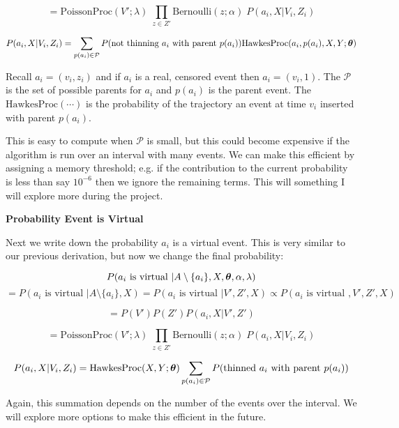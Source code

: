 \documentclass[11pt]{article}
\begin{document}
\[
  =
  \text{PoissonProc}(V'; \lambda)
  \;
  \prod_{z \in Z'}\text{Bernoulli}(z; \alpha) 
  \;
  P(a_i, X | V_i, Z_i)  
\]

\[
  P(a_i, X | V_i, Z_i)
  =
  \sum_{p(a_i) \in \mathcal{P}}
  P(\text{not thinning } a_i \text{ with parent } p(a_i))
  \text{HawkesProc}(a_i,p(a_i),X,Y; \boldsymbol{\theta})
\]

\noindent Recall $a_i = (v_i,z_i)$ and if $a_i$ is a real, censored event then $a_i = (v_i, 1)$. The $\mathcal{P}$ is the set of possible parents for $a_i$ and $p(a_i)$ is the parent event. The $\text{HawkesProc}(\cdots)$ is the probability of the trajectory an event at time $v_i$ inserted with parent $p(a_i)$.


This is easy to compute when $\mathcal{P}$ is small, but this could become expensive if the algorithm is run over an interval with many events. We can make this efficient by assigning a memory threshold; e.g. if the contribution to the current probability is less than say $10^{-6}$ then we ignore the remaining terms. This will something I will explore more during the project.

\vspace{1cm}
\noindent\textbf{Probability Event is Virtual}

\noindent Next we write down the probability $a_i$ is a virtual event. This is very similar to our previous derivation, but now we change the final probability:

\[
  P(a_i \text{ is virtual } | A \setminus \{a_i\}, X, \boldsymbol{\theta}, \alpha, \lambda)
\]
\[
  =
  P(a_i \text{ is virtual } | A \setminus \{a_i\}, X)
  =
  P(a_i \text{ is virtual } | V', Z', X)
  \propto
  P(a_i \text{ is virtual }, V', Z', X)
\]

\[
  =
  P(V')P(Z')P(a_i, X | V', Z')
\]

\[
  =
  \text{PoissonProc}(V'; \lambda)
  \;
  \prod_{z \in Z'}\text{Bernoulli}(z; \alpha) 
  \;
  P(a_i, X | V_i, Z_i)  
\]

\[
  P(a_i, X | V_i, Z_i)
  =
  \text{HawkesProc}(X,Y; \boldsymbol{\theta})
  \sum_{p(a_i) \in \mathcal{P}}
  P(\text{thinned } a_i \text{ with parent } p(a_i))
\]


\noindent Again, this summation depends on the number of the events over the interval. We will explore more options to make this efficient in the future.
\end{document}
